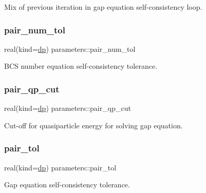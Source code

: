Mix of previous iteration in gap equation self-\/consistency loop. 

\mbox{\label{group__INPUT__PARS_gad39a7f1795d33065b388d6966d51e190}} 
\subsubsection{\texorpdfstring{pair\+\_\+num\+\_\+tol}{pair\_num\_tol}}
{\footnotesize\ttfamily real(kind=\mbox{\hyperlink{namespaceparameters_a52f8c6351fd79345d8811e065bcbbb37}{dp}}) parameters\+::pair\+\_\+num\+\_\+tol}



B\+CS number equation self-\/consistency tolerance. 

\mbox{\label{group__INPUT__PARS_gaddd04025cfa9a151f25211259364f404}} 
\subsubsection{\texorpdfstring{pair\+\_\+qp\+\_\+cut}{pair\_qp\_cut}}
{\footnotesize\ttfamily real(kind=\mbox{\hyperlink{namespaceparameters_a52f8c6351fd79345d8811e065bcbbb37}{dp}}) parameters\+::pair\+\_\+qp\+\_\+cut}



Cut-\/off for quasiparticle energy for solving gap equation. 

\mbox{\label{group__INPUT__PARS_ga9b9d6d0cf64fa6e7f9dd00f5b15848bd}} 
\subsubsection{\texorpdfstring{pair\+\_\+tol}{pair\_tol}}
{\footnotesize\ttfamily real(kind=\mbox{\hyperlink{namespaceparameters_a52f8c6351fd79345d8811e065bcbbb37}{dp}}) parameters\+::pair\+\_\+tol}



Gap equation self-\/consistency tolerance. 


